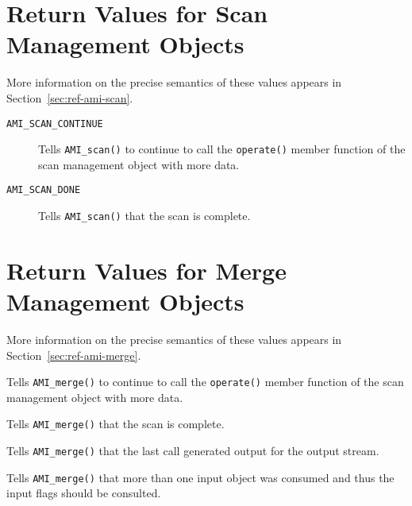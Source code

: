 \section{Return Values for Scan Management Objects}

More information on the precise semantics of these values appears in
Section~\ref{sec:ref-ami-scan}.
\begin{description}
\item[{\tt AMI\_SCAN\_CONTINUE}]  Tells \verb|AMI_scan()| to continue
  to call the \verb|operate()| member function of the scan management
  object with more data.
\item[{\tt AMI\_SCAN\_DONE}]  Tells \verb|AMI_scan()| that the scan is
  complete. 
\end{description}

\section{Return Values for Merge Management Objects}

More information on the precise semantics of these values appears in
Section~\ref{sec:ref-ami-merge}.
\begin{description}
\item[{\tt AMI\_MERGE\_CONTINUE}] Tells \verb|AMI_merge()| to continue
  to call the \verb|operate()| member function of the scan management
  object with more data.
\item[{\tt AMI\_MERGE\_DONE}] Tells \verb|AMI_merge()| that the scan is
  complete. 
\item[{\tt AMI\_MERGE\_OUTPUT}]  Tells \verb|AMI_merge()| that the
  last call generated output for the output stream.
\item[{\tt AMI\_MERGE\_READ\_MULTIPLE}]  Tells \verb|AMI_merge()| that
  more than one input object was consumed and thus the input flags
  should be consulted.
\end{description}


